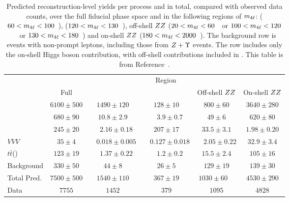 \begin{table}
    \centering    
  \begin{tabular} {l  c  c  c  c  c }
 \hline 
  & \multicolumn{5}{c}{Region} \\
      & Full   & \ZFourL{}  & \HFourL{}  & Off-shell $ZZ$  & On-shell $ZZ$   \\

 \hline 
\qqFourL{} & $6100 \pm 500$  & $1490 \pm 120$  & $128 \pm 10$  & $800 \pm 60$  & $3640 \pm 280$ \\
\ggFourL{} & $680 \pm 90$  & $10.8 \pm 2.9$  & ~~$3.9 \pm 0.7$  & $49 \pm 6$  & $620 \pm 80$ \\
\HFourL{}  & $245 \pm 20$  & ~~$2.16 \pm 0.18$  & $207 \pm 17$  & $33.5 \pm 3.1$  & $1.98 \pm 0.20$ \\
$VVV$  & $35 \pm 4$  & ~~$0.018 \pm 0.005$  & ~~$0.127 \pm 0.018$  & ~~$2.05 \pm 0.22$  & $32.9 \pm 3.4$ \\
$t\bar{t}$\V(\V) & $123 \pm 19$  & ~~$1.37 \pm 0.22$  & ~~$1.2 \pm 0.2$  & $15.5 \pm 2.4$  & $105 \pm 16$ \\
Background & $330 \pm 50$  & $44 \pm 8$  & $26 \pm 5$  & $129 \pm 19$  & $139 \pm 30$ \\    
\hline 
Total Pred. & $7500 \pm 500$  & $1540 \pm 110$  & $367 \pm 19$  & $1030 \pm 60$~~  & $4530 \pm 290$ \\
\hline 
Data & $7755 $  & $1452 $  & $379 $  & $1095 $  & $4828 $ \\
 \hline 
 \end{tabular}
     \caption{Predicted reconstruction-level yields per process and in total,
      compared with observed data counts, over the full fiducial phase space and in the
      following regions of
      $m_{4\ell}$: \ZFourL{}  ($60 < m_{4\ell} < 100$~\GeV), \HFourL{}  ($120 <
m_{4\ell} < 130$~\GeV), off-shell $ZZ$  ($20 <
m_{4\ell} < 60$~\GeV\ or $100 <
m_{4\ell} < 120$~\GeV\ or $130 <
m_{4\ell} < 180$~\GeV) and  on-shell $ZZ$ ($180 <
m_{4\ell} < 2000$~\GeV).
     The background row is events with non-prompt leptons,
     including those from $Z{} + \Upsilon{}$ events.
      The \HFourL{} row includes only the
      on-shell Higgs boson contribution, with off-shell contributions included in
     \ggFourL{}. This table is from Reference~\cite{m4l_internalnote}. \label{tab:RecoYieldTablePerProcess} }
\end{table}


